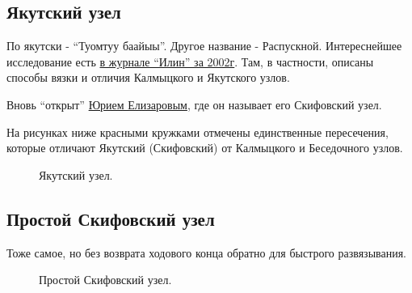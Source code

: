 \subsection{Якутский узел}

По якутски - \enquote{Туомтуу баайыы}. Другое название - Распускной. Интереснейшее исследование есть \href{http://ilin-yakutsk.narod.ru/2002-4/savinov.htm}{в журнале \enquote{Илин} за 2002г}. Там, в частности, описаны способы вязки и отличия Калмыцкого и Якутского узлов.

Вновь \enquote{открыт} \href{http://www.muzel.ru/article/za/skifovsky.htm}{Юрием Елизаровым}, где он называет его Скифовский узел.

\begin{figure}[H]\centering
	\subfloat[Результат]{\label{ris:Skif_1}
	\tcbox[enhanced jigsaw,colframe=black,opacityframe=0.5,opacityback=0.5]
		{\centering
			}
		}
\end{figure}

На рисунках ниже красными кружками отмечены единственные пересечения, которые отличают Якутский (Скифовский) от Калмыцкого и Беседочного узлов.

\begin{figure}[H]\centering
\end{figure}

\begin{figure}[H]\centering
	\caption{Якутский узел.}\label{ris:Skif}
\end{figure}

\subsection{Простой Скифовский узел}

Тоже самое, но без возврата ходового конца обратно для быстрого развязывания.

\begin{figure}[H]\centering
	\setcounter{subfigure}{0}
	\addtocounter{figure}{1}
	\begin{minipage}{1\linewidth}
		\begin{center}
			\tcbox[enhanced jigsaw,colframe=black,opacityframe=0.5,opacityback=0.5]
			{\centering{}}
		\end{center}
	\end{minipage}
	\addtocounter{figure}{-1}
	\caption{Простой Скифовский узел.}
	\label{ris:Skif_simpl}
\end{figure}


